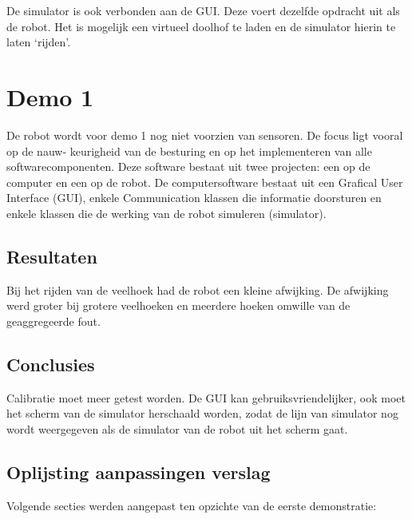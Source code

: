 \documentclass[eind]{penoverslag}
\begin{document}
De simulator is ook verbonden aan de GUI. Deze voert dezelfde opdracht uit als de robot. Het is mogelijk een virtueel doolhof te laden en de simulator hierin te laten `rijden'.


\newpage
\makeappendix

\section{Demo 1} %
\label{Asec:demo1}
De robot wordt voor demo 1 nog niet voorzien van sensoren. De focus ligt vooral op de nauw-
keurigheid van de besturing en op het implementeren van alle softwarecomponenten. Deze software
bestaat uit twee projecten: een op de computer en een op de robot. De computersoftware bestaat
uit een Grafical User Interface (GUI), enkele Communication klassen die informatie doorsturen en
enkele klassen die de werking van de robot simuleren (simulator).

\subsection{Resultaten} %
\label{Assec:result1}
Bij het rijden van de veelhoek had de robot een kleine afwijking. De afwijking werd groter bij grotere veelhoeken en meerdere hoeken omwille van de geaggregeerde fout.

\subsection{Conclusies} %
\label{Assec:conc1}
Calibratie moet meer getest worden. De GUI kan gebruiksvriendelijker, ook moet het scherm van de simulator herschaald worden, zodat de lijn van simulator nog wordt weergegeven als de simulator van de robot uit het scherm gaat.

\subsection{Oplijsting aanpassingen verslag} %
\label{Assec:aanp1}
Volgende secties werden aangepast ten opzichte van de eerste demonstratie:
\end{document}

